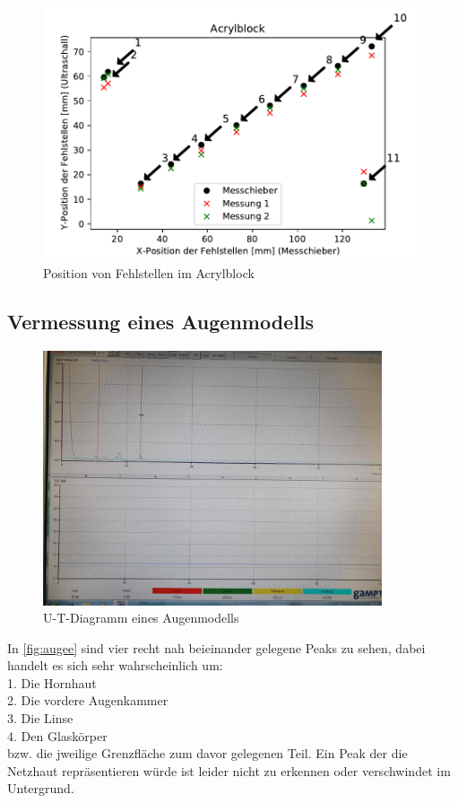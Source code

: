   \begin{figure}
    \centering
    \includegraphics{acrylblock.pdf}
    \caption{Position von Fehlstellen im Acrylblock}
    \label{fig:acrylblock}
  \end{figure}
  \pagebreak
  
  \subsection{Vermessung eines Augenmodells}
  \label{sec:auge}

  \begin{figure}[h]
    \label{fig:auge}
    \centering
    \includegraphics[width=10cm]{Auge}
    \caption{U-T-Diagramm eines Augenmodells}
\end{figure}
In \autoref{fig:augee} sind vier recht nah beieinander gelegene Peaks zu sehen, dabei handelt es sich sehr wahrscheinlich um:\\
 1. Die Hornhaut\\
 2. Die vordere Augenkammer\\
 3. Die Linse\\
 4. Den Glaskörper\\
 bzw. die jweilige Grenzfläche zum davor gelegenen Teil. Ein Peak der die Netzhaut repräsentieren würde ist leider nicht zu erkennen oder verschwindet 
 im Untergrund.   